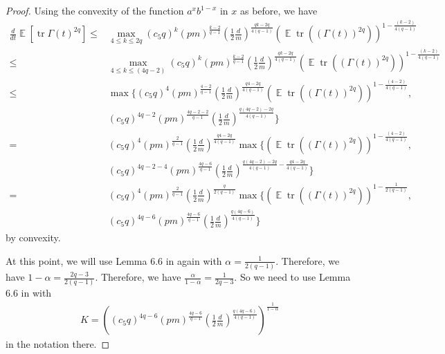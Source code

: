 \documentclass[11pt]{amsart}
\numberwithin{equation}{section}
\numberwithin{equation}{section}
\DeclareMathOperator{\E}{\mathbb{E}}
\DeclareMathOperator*{\tr}{tr}
\theoremstyle{remark}
\theoremstyle{definition}
\begin{document}
\begin{proof}
Using the convexity of the function $a^xb^{1-x}$ in $x$ as before, we have
\begin{align*}
\frac{d}{dt} \E[\tr \Gamma(t)^{2q}] \le & \max \limits_{4 \le k \le 2q} (c_5q)^k (pm)^{\frac{k-2}{q-1}}  (\frac{1}{2}\frac{d}{m})^{\frac{qk-2q}{4(q-1)}}(\E \tr((\Gamma(t))^{2q}))^{1-\frac{(k-2)}{4(q-1)}}
\\  \le   & \max \limits_{4 \le k \le (4q-2)} (c_5q)^k (pm)^{\frac{k-2}{q-1}} (\frac{1}{2}\frac{d}{m})^{\frac{qk-2q}{4(q-1)}}(\E \tr((\Gamma(t))^{2q}))^{1-\frac{(k-2)}{4(q-1)}}
\\ \le & \max\{(c_5q)^4 (pm)^{\frac{4-2}{q-1}}  (\frac{1}{2}\frac{d}{m})^{\frac{q4-2q}{4(q-1)}}(\E \tr((\Gamma(t))^{2q}))^{1-\frac{(4-2)}{4(q-1)}},\\&(c_5q)^{4q-2} (pm)^{\frac{4q-2-2}{q-1}}  (\frac{1}{2}\frac{d}{m})^{\frac{q(4q-2)-2q}{4(q-1)}}\}
\\ = & (c_5q)^4 (pm)^{\frac{2}{q-1}} (\frac{1}{2}\frac{d}{m})^{\frac{q4-2q}{4(q-1)}} \max\{(\E \tr((\Gamma(t))^{2q}))^{1-\frac{(4-2)}{4(q-1)}},\\&(c_5q)^{4q-2-4} (pm)^{\frac{4q-6}{q-1}} (\frac{1}{2}\frac{d}{m})^{\frac{q(4q-2)-2q}{4(q-1)}-\frac{q4-2q}{4(q-1)}}\}
\\ = & (c_5q)^4 (pm)^{\frac{2}{q-1}}  (\frac{1}{2}\frac{d}{m})^{\frac{q}{2(q-1)}} \max\{(\E \tr((\Gamma(t))^{2q}))^{1-\frac{1}{2(q-1)}},\\&(c_5q)^{4q-6} (pm)^{\frac{4q-6}{q-1}} (\frac{1}{2}\frac{d}{m})^{\frac{q(4q-6)}{4(q-1)}}\}
\end{align*}
by convexity.

At this point, we will use Lemma 6.6 in \cite{brailovskaya2022universality} again with $\alpha=\frac{1}{2(q-1)}$. Therefore, we have $1-\alpha=\frac{2q-3}{2(q-1)}$. Therefore, we have $\frac{\alpha}{1-\alpha}=\frac{1}{2q-3}$. So we need to use Lemma 6.6 in \cite{brailovskaya2022universality} with
\begin{align*}
    K=((c_5q)^{4q-6} (pm)^{\frac{4q-6}{q-1}} (\frac{1}{2}\frac{d}{m})^{\frac{q(4q-6)}{4(q-1)}})^{\frac{1}{1-\alpha}}
\end{align*}
in the notation there.


\end{proof}
\end{document}

